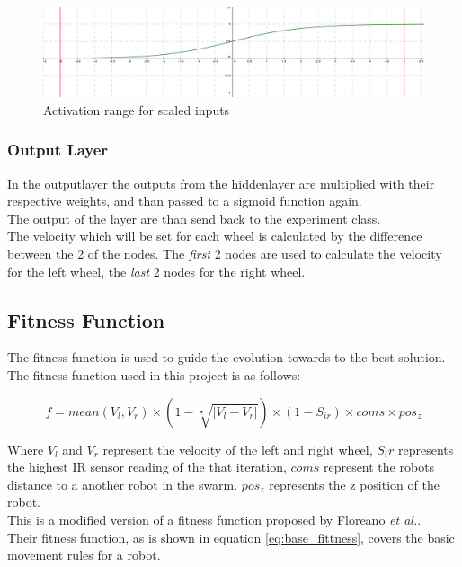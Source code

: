 \begin{figure}[h]
\begin{center}
\includegraphics[scale=0.4]{Chapter2/images/scaled.PNG}
\caption{Activation range for scaled inputs}
\label{fig:scaled}
\end{center}
\end{figure}

\subsubsection{Output Layer}
In the outputlayer the outputs from the hiddenlayer are multiplied with their respective weights, and than passed to a sigmoid function again.\\
The output of the layer are than send back to the experiment class.\\
The velocity which will be set for each wheel is calculated by the difference between the 2 of the nodes. 
The \textit{first} 2 nodes are used to calculate the velocity for the left wheel, the \textit{last} 2 nodes for the right wheel. 

\subsection{Fitness Function}\label{chap2:fitness_function}
The fitness function is used to guide the evolution towards to the best solution.\\
The fitness function used in this project is as follows:

\begin{equation}\label{eq:full_fittness}
f = mean(V_l, V_r) \times (1 - \sqrt[•]{|V_l - V_r|}) \times (1 - S_{ir}) \times coms \times pos_z
\end{equation}

Where $V_l$ and $V_r$ represent the velocity of the left and right wheel, $S_ir$ represents the highest IR sensor reading of the that iteration, $coms$ represent the robots distance to a another robot in the swarm. $pos_z$ represents the z position of the robot. \\
This is a modified version of a fitness function proposed by Floreano \textit{et al.}\cite{499791}. \\
Their fitness function, as is shown in equation \ref{eq:base_fittness}, covers the basic movement rules for a robot. 

